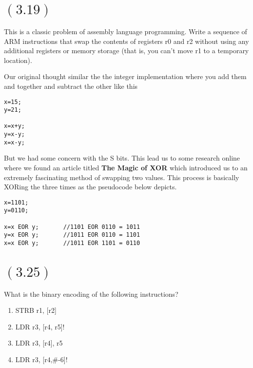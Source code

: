 \documentclass[letterpaper,12pt,titlepage]{article}
\begin{document}
\section*{$(3.19)$} This is a classic problem of assembly language programming. Write a sequence of ARM instructions that swap the contents of registers r0 and r2 without using any additional registers or memory storage (that is, you can't move r1 to a temporary location).
\begin{mdframed}[style=MyFrame]
Our original thought similar the the integer implementation where you add them and together and subtract the other like this
\begin{verbatim}
x=15;
y=21;

x=x+y;
y=x-y;
x=x-y;
\end{verbatim}
But we had some concern with the S bits. This lead us to some research online where we found an article titled \textbf{The Magic of XOR} \cite{Charles} which introduced us to an extremely fascinating method of swapping two values. This process is basically XORing the three times as the pseudocode below depicts.
\begin{verbatim}
x=1101;
y=0110;

x=x EOR y;       //1101 EOR 0110 = 1011
y=x EOR y;       //1011 EOR 0110 = 1101
x=x EOR y;       //1011 EOR 1101 = 0110
\end{verbatim}
\vspace{-0.5cm}
\end{mdframed}

\newpage
\section*{$(3.25)$} What is the binary encoding of the following instructions?
\renewcommand{\labelenumi}{\alph{enumi})}
\begin{enumerate}

\item STRB r1, [r2]

\item LDR r3, [r4, r5]!

\item LDR r3, [r4], r5

\item LDR r3, [r4,\#-6]!

\end{enumerate}
\end{document}
